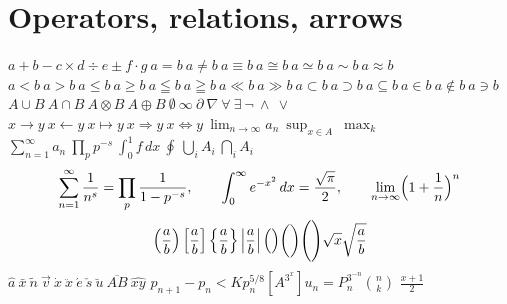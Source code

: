 \section*{Operators, relations, arrows}
$a+b-c\times d\div e\pm f\cdot g\ a=b\ a\neq b\ a\equiv b\ a\cong b\ a\simeq b\ a\sim b\ a\approx b$\\
$a<b\ a>b\ a\le b\ a\ge b\ a\leqq b\ a\geqq b\ a\ll b\ a\gg b\ a\subset b\ a\supset b\ a\subseteq b\ a\in b\ a\notin b\ a\ni b$\\
$A\cup B\ A\cap B\ A\otimes B\ A\oplus B\ \emptyset\ \infty\ \partial\ \nabla\ \forall\ \exists\ \neg\ \wedge\ \vee$\\
$x\to y\ x\leftarrow y\ x\mapsto y\ x\Rightarrow y\ x\Leftrightarrow y\ \lim_{n\to\infty} a_n\ \sup_{x\in A}\ \max_k$\\
$\sum_{n=1}^\infty a_n\ \prod_p p^{-s}\ \int_0^1 f\,dx\ \oint\ \bigcup_i A_i\ \bigcap_i A_i$
\[ \sum_{n=1}^\infty \frac{1}{n^s} = \prod_p \frac{1}{1-p^{-s}},\qquad \int_0^\infty e^{-x^2}\,dx=\frac{\sqrt\pi}{2},\qquad \lim_{n\to\infty}\Bigl(1+\frac1n\Bigr)^n \]
\[ \left( \frac{a}{b} \right) \left[ \frac{a}{b} \right] \left\{ \frac{a}{b} \right\} \left| \frac{a}{b} \right| \Bigl( \Bigr) \biggl( \biggr) \Biggl( \Biggr) \sqrt{x} \sqrt{\frac{a}{b}} \]
$\hat a\ \bar x\ \tilde n\ \vec v\ \dot x\ \ddot x\ \acute e\ \check s\ \breve u\ \overline{AB}\ \widehat{xy}$\quad
$p_{n+1}-p_n<Kp_n^{5/8}$\quad $[A^{3^x}]$\quad $u_n=P_n^{3^{-n}}$\quad $\binom{n}{k}$ $\frac{x+1}{2}$
